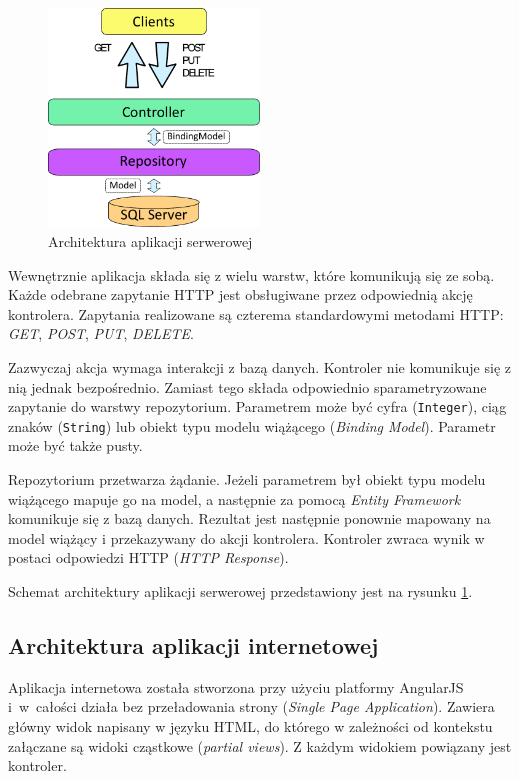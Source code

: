 \documentclass[a4paper]{book}
\begin{document}
			\begin{figure}
							\centering
							\includegraphics[width=0.5\textwidth]{images/architektura_server.pdf}
							\caption{Architektura aplikacji serwerowej}
							\label{fig:architektura_server}
		    \end{figure}
						
			Wewnętrznie aplikacja składa się z wielu warstw, które komunikują się ze sobą. Każde odebrane zapytanie HTTP jest obsługiwane przez odpowiednią akcję kontrolera. Zapytania realizowane są czterema standardowymi metodami HTTP: \emph{GET}, \emph{POST}, \emph{PUT}, \emph{DELETE}.
			
			Zazwyczaj akcja wymaga interakcji z bazą danych. Kontroler nie komunikuje się z nią jednak bezpośrednio. Zamiast tego składa odpowiednio sparametryzowane zapytanie do warstwy repozytorium. Parametrem może być cyfra (\texttt{Integer}), ciąg znaków (\texttt{String}) lub obiekt typu modelu wiążącego (\emph{Binding Model}). Parametr może być także pusty. 
			
			Repozytorium przetwarza żądanie. Jeżeli parametrem był obiekt typu modelu wiążącego mapuje go na model, a następnie za pomocą \emph{Entity Framework} komunikuje się z bazą danych. Rezultat jest następnie ponownie mapowany na model wiążący i przekazywany do akcji kontrolera. Kontroler zwraca wynik w postaci odpowiedzi HTTP (\emph{HTTP Response}).
			
			Schemat architektury aplikacji serwerowej przedstawiony jest na rysunku \ref{fig:architektura_server}. 			
			
			\subsection{Architektura aplikacji internetowej}		
			
			

			Aplikacja internetowa została stworzona przy użyciu platformy AngularJS i~w~całości działa bez przeładowania strony (\emph{Single Page Application}). Zawiera główny widok napisany w języku HTML, do którego w zależności od kontekstu załączane są widoki cząstkowe (\emph{partial views}). Z każdym widokiem powiązany jest kontroler. 
			
\end{document}
